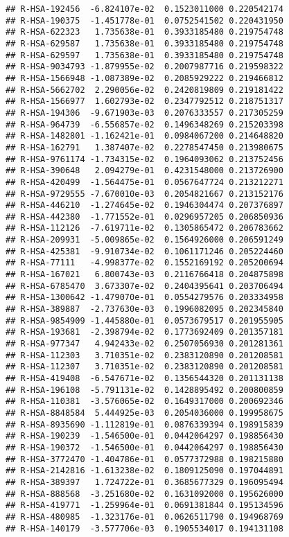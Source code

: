 \documentclass[
]{article}
\begin{document}
\begin{verbatim}
## R-HSA-192456  -6.824107e-02  0.1523011000 0.220542174
## R-HSA-190375  -1.451778e-01  0.0752541502 0.220431950
## R-HSA-622323   1.735638e-01  0.3933185480 0.219754748
## R-HSA-629587   1.735638e-01  0.3933185480 0.219754748
## R-HSA-629597   1.735638e-01  0.3933185480 0.219754748
## R-HSA-9034793 -1.879955e-02  0.2007987716 0.219598322
## R-HSA-1566948 -1.087389e-02  0.2085929222 0.219466812
## R-HSA-5662702  2.290056e-02  0.2420819809 0.219181422
## R-HSA-1566977  1.602793e-02  0.2347792512 0.218751317
## R-HSA-194306  -9.671903e-03  0.2076333557 0.217305259
## R-HSA-964739  -6.556857e-02  0.1496348269 0.215203398
## R-HSA-1482801 -1.162421e-01  0.0984067200 0.214648820
## R-HSA-162791   1.387407e-02  0.2278547450 0.213980675
## R-HSA-9761174 -1.734315e-02  0.1964093062 0.213752456
## R-HSA-390648   2.094279e-01  0.4231548000 0.213726900
## R-HSA-420499  -1.564475e-01  0.0567647724 0.213212271
## R-HSA-9729555 -7.670010e-03  0.2054821667 0.213152176
## R-HSA-446210  -1.274645e-02  0.1946304474 0.207376897
## R-HSA-442380  -1.771552e-01  0.0296957205 0.206850936
## R-HSA-112126  -7.619711e-02  0.1305865472 0.206783662
## R-HSA-209931  -5.009865e-02  0.1564926000 0.206591249
## R-HSA-425381  -9.910734e-02  0.1061171246 0.205224460
## R-HSA-77111   -4.998377e-02  0.1552169192 0.205200694
## R-HSA-167021   6.800743e-03  0.2116766418 0.204875898
## R-HSA-6785470  3.673307e-02  0.2404395641 0.203706494
## R-HSA-1300642 -1.479070e-01  0.0554279576 0.203334958
## R-HSA-389887  -2.737630e-03  0.1996082095 0.202345840
## R-HSA-9854909 -1.445880e-01  0.0573679517 0.201955905
## R-HSA-193681  -2.398794e-02  0.1773692409 0.201357181
## R-HSA-977347   4.942433e-02  0.2507056930 0.201281361
## R-HSA-112303   3.710351e-02  0.2383120890 0.201208581
## R-HSA-112307   3.710351e-02  0.2383120890 0.201208581
## R-HSA-419408  -6.547671e-02  0.1356544320 0.201131138
## R-HSA-196108  -5.791131e-02  0.1428895492 0.200800859
## R-HSA-110381  -3.576065e-02  0.1649317000 0.200692346
## R-HSA-8848584  5.444925e-03  0.2054036000 0.199958675
## R-HSA-8935690 -1.112819e-01  0.0876339394 0.198915839
## R-HSA-190239  -1.546500e-01  0.0442064297 0.198856430
## R-HSA-190372  -1.546500e-01  0.0442064297 0.198856430
## R-HSA-3772470 -1.404786e-01  0.0577372988 0.198215880
## R-HSA-2142816 -1.613238e-02  0.1809125090 0.197044891
## R-HSA-389397   1.724722e-01  0.3685677329 0.196095494
## R-HSA-888568  -3.251680e-02  0.1631092000 0.195626000
## R-HSA-419771  -1.259964e-01  0.0691381844 0.195134596
## R-HSA-480985  -1.323176e-01  0.0626511790 0.194968769
## R-HSA-140179  -3.577706e-03  0.1905534017 0.194131108

\end{verbatim}
\end{document}
